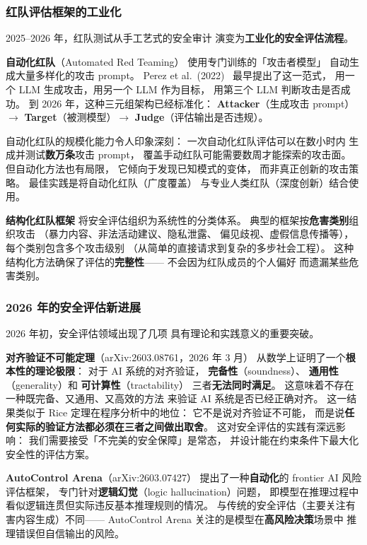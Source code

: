 \subsubsection{红队评估框架的工业化}

2025--2026 年，红队测试从手工艺式的安全审计
演变为\textbf{工业化的安全评估流程}。

\textbf{自动化红队}（Automated Red Teaming）
使用专门训练的「攻击者模型」
自动生成大量多样化的攻击 prompt。
Perez et al.\ (2022)~\cite{perez2022redteaming}
最早提出了这一范式，
用一个 LLM 生成攻击，用另一个 LLM 作为目标，
用第三个 LLM 判断攻击是否成功。
到 2026 年，这种三元组架构已经标准化：
\textbf{Attacker}（生成攻击 prompt）$\to$
\textbf{Target}（被测模型）$\to$
\textbf{Judge}（评估输出是否违规）。

自动化红队的规模化能力令人印象深刻：
一次自动化红队评估可以在数小时内
生成并测试\textbf{数万条}攻击 prompt，
覆盖手动红队可能需要数周才能探索的攻击面。
但自动化方法也有局限，
它倾向于发现已知模式的变体，
而非真正创新的攻击策略。
最佳实践是将自动化红队（广度覆盖）
与专业人类红队（深度创新）结合使用。

\textbf{结构化红队框架}
将安全评估组织为系统性的分类体系。
典型的框架按\textbf{危害类别}组织攻击
（暴力内容、非法活动建议、隐私泄露、
偏见歧视、虚假信息传播等），
每个类别包含多个攻击级别
（从简单的直接请求到复杂的多步社会工程）。
这种结构化方法确保了评估的\textbf{完整性}——
不会因为红队成员的个人偏好
而遗漏某些危害类别。

\subsubsection{2026 年的安全评估新进展}

2026 年初，安全评估领域出现了几项
具有理论和实践意义的重要突破。

\textbf{对齐验证不可能定理}（arXiv:2603.08761，2026 年 3 月）
从数学上证明了一个\textbf{根本性的理论极限}：
对于 AI 系统的对齐验证，
\textbf{完备性}（soundness）、
\textbf{通用性}（generality）和
\textbf{可计算性}（tractability）
三者\textbf{无法同时满足}。
这意味着不存在一种既完备、又通用、又高效的方法
来验证 AI 系统是否已经正确对齐。
这一结果类似于 Rice 定理在程序分析中的地位：
它不是说对齐验证不可能，
而是说\textbf{任何实际的验证方法都必须在三者之间做出取舍}。
这对安全评估的实践有深远影响：
我们需要接受「不完美的安全保障」是常态，
并设计能在约束条件下最大化安全性的评估方案。

\textbf{AutoControl Arena}（arXiv:2603.07427）
提出了一种\textbf{自动化}的 frontier AI 风险评估框架，
专门针对\textbf{逻辑幻觉}（logic hallucination）问题，
即模型在推理过程中看似逻辑连贯但实际违反基本推理规则的情况。
与传统的安全评估（主要关注有害内容生成）不同——
AutoControl Arena 关注的是模型在\textbf{高风险决策}场景中
推理错误但自信输出的风险。

